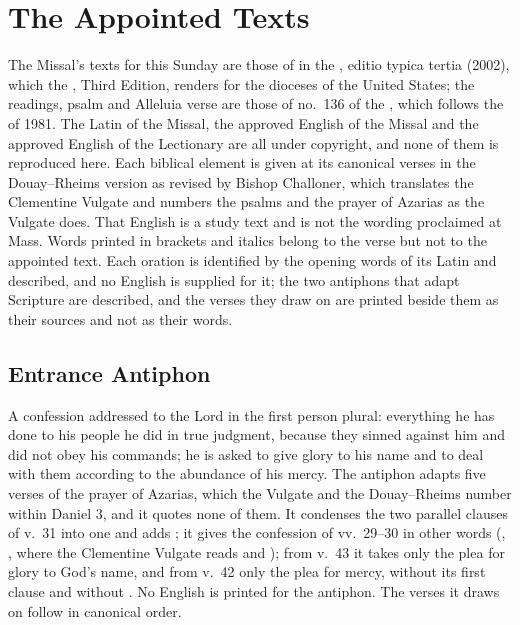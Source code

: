 \section{The Appointed Texts}
\label{sec:appointed-texts}

The Missal's texts for this Sunday are those of  in the , editio typica tertia (2002), which the
, Third Edition, renders for the dioceses of the United
States; the readings, psalm and Alleluia verse are those of no.~136 of the
, which follows the  of
1981. The Latin of the Missal, the approved English of the Missal and the
approved English of the Lectionary are all under copyright, and none of them
is reproduced here. Each biblical element is given at its canonical verses in
the Douay--Rheims version as revised by Bishop Challoner, which translates the
Clementine Vulgate and numbers the psalms and the prayer of Azarias as the
Vulgate does. That English is a study text and is not the wording proclaimed at
Mass. Words printed in brackets and italics belong to the verse but not to the
appointed text. Each oration is identified by the opening words of its Latin
and described, and no English is supplied for it; the two antiphons that adapt
Scripture are described, and the verses they draw on are printed beside them as
their sources and not as their words.

\subsection{Entrance Antiphon}
\label{proper-entrance-antiphon}


\noindent A confession addressed to the Lord in the first person plural:
everything he has done to his people he did in true judgment, because they
sinned against him and did not obey his commands; he is asked to give glory to
his name and to deal with them according to the abundance of his mercy. The
antiphon adapts five verses of the prayer of Azarias, which the Vulgate and the
Douay--Rheims number within Daniel 3, and it quotes none of them. It condenses
the two parallel clauses of v.~31 into one and adds ; it gives the
confession of vv.~29--30 in other words (,
, where the Clementine Vulgate reads
 and ); from v.~43 it takes only the plea for glory to God's name, and from
v.~42 only the plea for mercy, without its first clause and without
. No English is printed for the antiphon. The
verses it draws on follow in canonical order.

